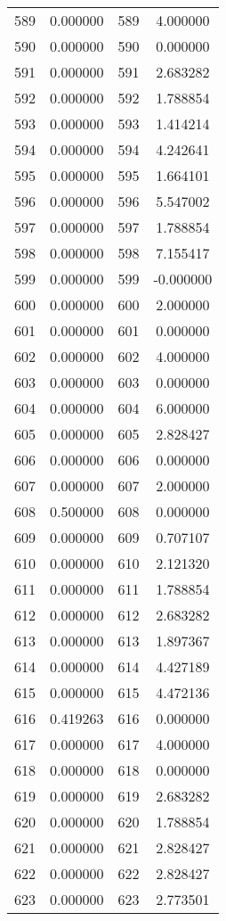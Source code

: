 \documentclass[12pt]{article}
\begin{document}
\begin{longtable}{@{}cccc@{}}
589 & 0.000000 & 589 & 4.000000 \\
590 & 0.000000 & 590 & 0.000000 \\
591 & 0.000000 & 591 & 2.683282 \\
592 & 0.000000 & 592 & 1.788854 \\
593 & 0.000000 & 593 & 1.414214 \\
594 & 0.000000 & 594 & 4.242641 \\
595 & 0.000000 & 595 & 1.664101 \\
596 & 0.000000 & 596 & 5.547002 \\
597 & 0.000000 & 597 & 1.788854 \\
598 & 0.000000 & 598 & 7.155417 \\
599 & 0.000000 & 599 & -0.000000 \\
600 & 0.000000 & 600 & 2.000000 \\
601 & 0.000000 & 601 & 0.000000 \\
602 & 0.000000 & 602 & 4.000000 \\
603 & 0.000000 & 603 & 0.000000 \\
604 & 0.000000 & 604 & 6.000000 \\
605 & 0.000000 & 605 & 2.828427 \\
606 & 0.000000 & 606 & 0.000000 \\
607 & 0.000000 & 607 & 2.000000 \\
608 & 0.500000 & 608 & 0.000000 \\
609 & 0.000000 & 609 & 0.707107 \\
610 & 0.000000 & 610 & 2.121320 \\
611 & 0.000000 & 611 & 1.788854 \\
612 & 0.000000 & 612 & 2.683282 \\
613 & 0.000000 & 613 & 1.897367 \\
614 & 0.000000 & 614 & 4.427189 \\
615 & 0.000000 & 615 & 4.472136 \\
616 & 0.419263 & 616 & 0.000000 \\
617 & 0.000000 & 617 & 4.000000 \\
618 & 0.000000 & 618 & 0.000000 \\
619 & 0.000000 & 619 & 2.683282 \\
620 & 0.000000 & 620 & 1.788854 \\
621 & 0.000000 & 621 & 2.828427 \\
622 & 0.000000 & 622 & 2.828427 \\
623 & 0.000000 & 623 & 2.773501 \\

\end{longtable}
\end{document}
